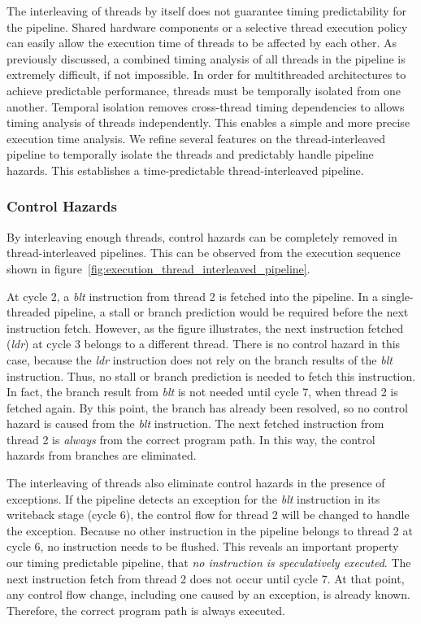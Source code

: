 The interleaving of threads by itself does not guarantee timing predictability for the pipeline.  
Shared hardware components or a selective thread execution policy can easily allow the execution time of threads to be affected by each other.    
As previously discussed, a combined timing analysis of all threads in the pipeline is extremely difficult, if not impossible.
In order for multithreaded architectures to achieve predictable performance, threads must be temporally isolated from one another. 
Temporal isolation removes cross-thread timing dependencies to allows timing analysis of threads independently.
This enables a simple and more precise execution time analysis.  
We refine several features on the thread-interleaved pipeline to temporally isolate the threads and predictably handle pipeline hazards.
This establishes a time-predictable thread-interleaved pipeline.

\subsubsection{Control Hazards}
By interleaving enough threads, control hazards can be completely removed in thread-interleaved pipelines.
This can be observed from the execution sequence shown in figure~\ref{fig:execution_thread_interleaved_pipeline}.

At cycle 2, a \emph{blt} instruction from thread 2 is fetched into the pipeline.
In a single-threaded pipeline, a stall or branch prediction would be required before the next instruction fetch.
However, as the figure illustrates, the next instruction fetched (\emph{ldr}) at cycle 3 belongs to a different thread.
There is no control hazard in this case, because the \emph{ldr} instruction does not rely on the branch results of the \emph{blt} instruction.  
Thus, no stall or branch prediction is needed to fetch this instruction.
In fact, the branch result from \emph{blt} is not needed until cycle 7, when thread 2 is fetched again.
By this point, the branch has already been resolved, so no control hazard is caused from the \emph{blt} instruction.
The next fetched instruction from thread 2 is \emph{always} from the correct program path.
In this way, the control hazards from branches are eliminated.  
  
The interleaving of threads also eliminate control hazards in the presence of exceptions.
If the pipeline detects an exception for the \emph{blt} instruction in its writeback stage (cycle 6), the control flow for thread 2 will be changed to handle the exception.  
Because no other instruction in the pipeline belongs to thread 2 at cycle 6, no instruction needs to be flushed.  
This reveals an important property our timing predictable pipeline, that \emph{no instruction is speculatively executed}.
The next instruction fetch from thread 2 does not occur until cycle 7.
At that point, any control flow change, including one caused by an exception, is already known.
Therefore, the correct program path is always executed.

